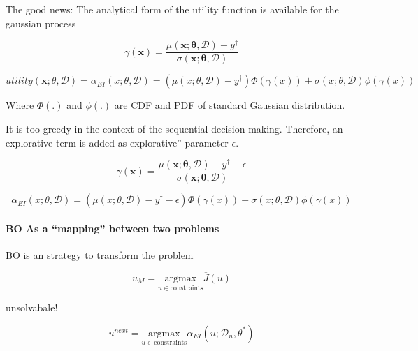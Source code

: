 \documentclass[]{elsarticle} %
\begin{document}
The good news: The analytical form of the utility function is available
for the gaussian process

\begin{equation}
\gamma(\mathbf{x})=\frac{\mu(\mathbf{x;\theta,\mathcal{D}})-y^{\dagger}}{\sigma(\mathbf{x;\theta,\mathcal{D}})}
\label{eq:uti_int_gamma}
\end{equation}

\begin{equation}
utility(\mathbf{x};\theta,\mathcal{D})=\alpha_{EI}(x;\theta,\mathcal{D})=(\mu(x;\theta,\mathcal{D})-y^{\dagger})\Phi(\gamma(x)) + \sigma(x;\theta,\mathcal{D})\phi(\gamma(x))
\label{eq:uti_int2}
\end{equation}

Where \(\Phi(.)\) and \(\phi(.)\) are CDF and PDF of standard Gaussian
distribution.

It is too greedy in the context of the sequential decision making.
Therefore, an explorative term is added as explorative'' parameter
\(\epsilon\).

\begin{equation}
\gamma(\mathbf{x})=\frac{\mu(\mathbf{x;\theta,\mathcal{D}})-y^{\dagger}-\epsilon}{\sigma(\mathbf{x;\theta,\mathcal{D}})}
\label{eq:uti_greed_gamma}
\end{equation}

\begin{equation}
\alpha_{EI}(x;\theta,\mathcal{D})=(\mu(x;\theta,\mathcal{D})-y^{\dagger}-\epsilon)\Phi(\gamma(x)) + \sigma(x;\theta,\mathcal{D})\phi(\gamma(x))
\label{eq:uti_int_gred2}
\end{equation}

\hypertarget{bo-as-a-mapping-between-two-problems}{%
\paragraph{BO As a ``mapping'' between two problems}\label{bo-as-a-mapping-between-two-problems}}

BO is an strategy to transform the problem

\begin{equation}
u_M = \underset{u\in \text{constraints}}{\mathrm{argmax}}\overline{J}(u)
\label{eq:exp_eq}
\end{equation}

unsolvabale!

\begin{equation}
u^{next}=\underset{u\in \text{constraints}}{\mathrm{argmax}} \alpha_{EI}(u;\mathcal{D}_n, \theta^\ast)
\label{eq:exp-easy}
\end{equation}
\end{document}
